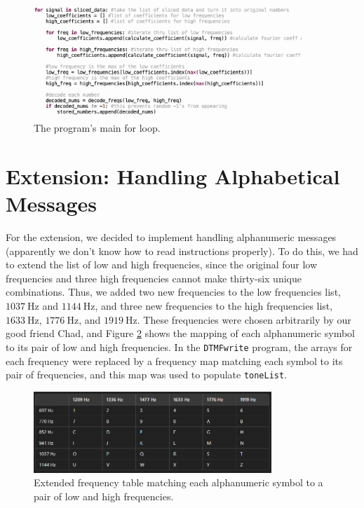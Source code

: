 \documentclass[12pt]{iopart}
\gdef\units#1{~\mathrm{#1}}
\begin{document}
\begin{figure}[h!tbp]
  \begin{center}
 \item[]\includegraphics[width=0.9\textwidth]{images/main_for_loop.png}
  \caption{\label{fig:main_for_loop}
  The program's main for loop.
  }
  \end{center}
\end{figure}

\section{Extension: Handling Alphabetical Messages}

For the extension, we decided to implement handling alphanumeric messages (apparently we don't know how to read instructions properly).
To do this, we had to extend the list of low and high frequencies, since the original four low frequencies and three high frequencies cannot make thirty-six unique combinations.
Thus, we added two new frequencies to the low frequencies list, $1037 \units{Hz}$ and $1144 \units{Hz}$, and three new frequencies to the high frequencies list, $1633 \units{Hz}$, $1776 \units{Hz}$, and $1919 \units{Hz}$.
These frequencies were chosen arbitrarily by our good friend Chad, and Figure \ref{fig:extended_freq_table} shows the mapping of each alphanumeric symbol to its pair of low and high frequencies. 
In the \verb|DTMFwrite| program, the arrays for each frequency were replaced by a frequency map matching each symbol to its pair of frequencies, and this map was used to populate \verb|toneList|.

\begin{figure}[h!tbp]
  \begin{center}
 \item[]\includegraphics[width=0.8\textwidth]{extended_freq_table.png}
  \caption{\label{fig:extended_freq_table}
  Extended frequency table matching each alphanumeric symbol to a pair of low and high frequencies.
  }
  \end{center}
\end{figure}
\end{document}
